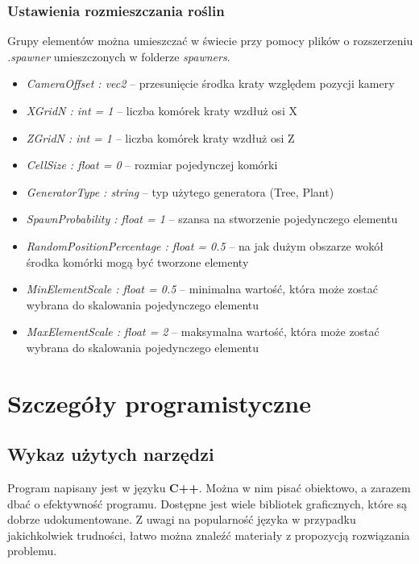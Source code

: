 \documentclass[inz,shortabstract]{iithesis}
\begin{document}
        \subsection{Ustawienia rozmieszczania roślin}
        Grupy elementów można umieszczać w świecie przy pomocy plików o rozszerzeniu
        \textit{.spawner} umieszczonych w folderze \textit{spawners}.
        \begin{itemize}
            \item \textit{CameraOffset : vec2} -- przesunięcie środka kraty względem pozycji kamery
            \item \textit{XGridN : int = 1} -- liczba komórek kraty wzdłuż osi X
            \item \textit{ZGridN : int = 1} -- liczba komórek kraty wzdłuż osi Z
            \item \textit{CellSize : float = 0} -- rozmiar pojedynczej komórki
            \item \textit{GeneratorType : string} -- typ użytego generatora (Tree, Plant)
            \item \textit{SpawnProbability : float = 1} -- szansa na stworzenie pojedynczego elementu 
            \item \textit{RandomPositionPercentage : float = 0.5} -- na jak dużym obszarze wokół środka komórki mogą być tworzone elementy
            \item \textit{MinElementScale : float = 0.5} -- minimalna wartość, która może zostać wybrana do skalowania pojedynczego elementu
            \item \textit{MaxElementScale : float = 2} -- maksymalna wartość, która może zostać wybrana do skalowania pojedynczego elementu
        \end{itemize}
    
        
\chapter{Szczegóły programistyczne}

    \section{Wykaz użytych narzędzi}
        Program napisany jest w języku \textbf{C++}. Można w nim pisać obiektowo, a zarazem dbać o efektywność programu. Dostępne jest wiele bibliotek graficznych, które są dobrze udokumentowane. Z uwagi na popularność języka w przypadku jakichkolwiek trudności, łatwo można znaleźć materiały z propozycją rozwiązania problemu.        
        
\end{document}

